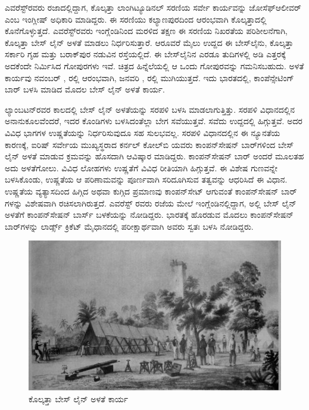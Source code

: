 ಎವರೆಸ್ಟ್​ರವರು ರಜಾದಲ್ಲಿದ್ದಾಗ, ಕೊಲ್ಕತ್ತಾ ಲಾಂಗಿಟ್ಯೂಡಿನಲ್​ ಸರಣಿಯ ಸರ್ವೇ ಕಾರ್ಯವನ್ನು ಜೋಸೆಫ್​ ಆಲೀವರ್​ ಎಂಬ ಇಂಗ್ಲೀಷ್​ ಅಧಿಕಾರಿ ಮಾಡಿದ್ದರು. ಈ ಸರಣಿಯು ಕಲ್ಯಾಣಪುರದಿಂದ ಆರಂಭವಾಗಿ ಕೊಲ್ಕತ್ತಾದಲ್ಲಿ ಕೊನೆಗೊಳ್ಳುತ್ತದೆ. ಎವರೆಸ್ಟ್​ರವರು ಇಂಗ್ಲೆಂಡಿನಿಂದ ಮರಳಿದ ತಕ್ಷಣ ಈ ಸರಣಿಯ ನಿಖರತೆಯ ಪರಿಶೀಲನೆಗಾಗಿ, ಕೊಲ್ಕತ್ತಾ ಬೇಸ್​ ಲೈನ್​ ಅಳತೆ ಮಾಡಲು ನಿರ್ಧರಿಸುತ್ತಾರೆ. ಆರೂವರೆ ಮೈಲು ಉದ್ದದ ಈ ಬೇಸ್​ಲೈನು, ಕೊಲ್ಕತ್ತಾ ಸರ್ಕಾರಿ ಗೃಹ ಮತ್ತು ಬರಾಕ್​ಪುರ ನಡುವಿನ ರಸ್ತೆಯಲ್ಲಿದೆ. ಈ ಬೇಸ್​ಲೈನಿನ ಎರಡೂ ತುದಿಗಳಲ್ಲಿ  ಅಡಿ ಎತ್ತರಕ್ಕೆ ಅದಕೆಂದೇ ನಿರ್ಮಿಸಿದ ಗೋಪುರಗಳು ಇವೆ. ಚಿತ್ರದ ಹಿನ್ನೆಲೆಯಲ್ಲಿ ಆ ಒಂದು ಗೋಪುರವನ್ನು ಗಮನಿಸಬಹುದು. ಅಳತೆ ಕಾರ್ಯವು ನವಂಬರ್​ ,  ರಲ್ಲಿ ಆರಂಭವಾಗಿ, ಜನವರಿ ,  ರಲ್ಲಿ ಮುಗಿಯುತ್ತದೆ. ಇದು ಭಾರತದಲ್ಲಿ, ಕಾಂಪೆನ್ಸೇಟಿಂಗ್​ ಬಾರ್​ ಬಳಸಿ ಮಾಡಿದ ಮೊದಲ ಬೇಸ್​ ಲೈನ್​ ಅಳತೆ ಕಾರ್ಯ.

ಲ್ಯಾಂಬಟನ್​ರವರ ಕಾಲದಲ್ಲಿ ಬೇಸ್​ ಲೈನ್​ ಅಳತೆಯನ್ನು ಸರಪಳಿ ಬಳಸಿ ಮಾಡಲಾಗುತ್ತಿತ್ತು. ಸರಪಳಿ ವಿಧಾನದಲ್ಲಿನ ಅನಾನುಕೂಲವೆಂದರೆ, ಇದರ ಕೊಂಡಿಗಳು ಬಳಸಿದಂತೆಲ್ಲಾ ಬೇಗ ಸವೆಯುತ್ತವೆ. ಸವೆದು ಉದ್ದದಲ್ಲಿ ಹಿಗ್ಗುತ್ತವೆ. ಅದರ ವಿವಿಧ ಭಾಗಗಳ ಉಷ್ಣತೆಯನ್ನು ನಿರ್ಧರಿಸುವುದೂ ಸಹ ಸುಲಭವಲ್ಲ. ಸರಪಳಿ ವಿಧಾನದಲ್ಲಿನ ಈ ನ್ಯೂನತೆಯ ಕಾರಣಕ್ಕೆ, ಐರಿಷ್​ ಸರ್ವೇಯ ಮುಖ್ಯಸ್ಥರಾದ ಕರ್ನಲ್​ ಕೋಲ್​ಬಿ ಯವರು ಕಾಂಪನ್​ಸೇಷನ್​ ಬಾರ್​ಗಳಿಂದ ಬೇಸ್​ ಲೈನ್​ ಅಳತೆ ಮಾಡುವ ಕ್ರಮವನ್ನು ಹೊಸದಾಗಿ ಆವಿಷ್ಕಾರ ಮಾಡಿದ್ದರು. ಕಾಂಪನ್​ಸೇಷನ್​ ಬಾರ್​ ಅಂದರೆ ಮೂಲತಹ ಅದು ಅಳತೆಗೋಲು. ವಿವಿಧ ಲೋಹಗಳು ಉಷ್ಣತೆಗೆ ವಿವಿಧ ರೀತಿಯಾಗಿ ಹಿಗ್ಗುತ್ತವೆ. ಈ ವಿಶೇಷ ಗುಣವನ್ನೇ ಬಳಸಿಕೊಂಡು, ಉಷ್ಣತೆಯ ಆ ಪರಿಣಾಮವನ್ನು ಪೂರ್ಣವಾಗಿ ಸರಿದೂಗಿಸುವ ತತ್ವವನ್ನು ಆಧರಿಸಿದೆ ಈ ವಿಧಾನ. ಉಷ್ಣತೆಯ ವ್ಯತ್ಯಾಸದಿಂದ ಹಿಗ್ಗಿದ ಅಥವಾ ಕುಗ್ಗಿದ ಪ್ರಮಾಣವು ಕಾಂಪನ್​ಸೇಟ್​ ಆಗುವಂತೆ ಕಾಂಪನ್​ಸೇಷನ್​ ಬಾರ್​ಗಳನ್ನು ವಿಶೇಷವಾಗಿ ರಚಿಸಲಾಗಿರುತ್ತದೆ. ಎವರೆಸ್ಟ್​ ರವರು ರಜೆಯ ಮೇಲೆ ಇಂಗ್ಲೆಂಡಿನಲ್ಲಿದ್ದಾಗ, ಅಲ್ಲಿ ಬೇಸ್​ ಲೈನ್​ ಅಳತೆಗೆ ಕಾಂಪನ್​ಸೇಷನ್​ ಬಾರ್ಸ್​ ಬಳಕೆಯನ್ನು ನೋಡಿದ್ದರು. ಭಾರತಕ್ಕೆ ಹೊರಡುವ ಮೊದಲು ಕಾಂಪನ್​ಸೇಷನ್​ ಬಾರ್​ಗಳನ್ನು ಲಾರ್ಡ್ಸ್ ಕ್ರಿಕೆಟ್​ ಮೈಧಾನದಲ್ಲಿ ಪರೀಕ್ಷಾರ್ಥವಾಗಿ ಅವರು ಸ್ವತಃ ಬಳಸಿ ನೋಡಿದ್ದರು.

\begin{figure}
\includegraphics[scale=0.6]{"images/image014.jpg"}
\caption{ಕೊಲ್ಕತ್ತಾ ಬೇಸ್​ ಲೈನ್​ ಅಳತೆ ಕಾರ್ಯ}\label{chap11-fig2}
\end{figure}

